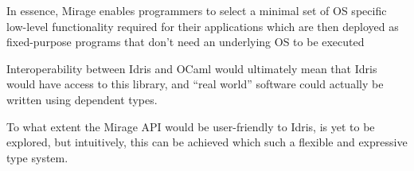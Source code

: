 In essence, Mirage enables programmers to select a minimal set of OS specific
low-level functionality required for their applications which are then deployed
as fixed-purpose programs that don't need an underlying OS to be executed

Interoperability between Idris and OCaml would ultimately mean
that Idris would have access to this library, and ``real world''
software could actually be written using dependent types.

To what extent the Mirage API would be user-friendly to Idris,
is yet to be explored, but intuitively, this can be achieved
which such a flexible and expressive type system.